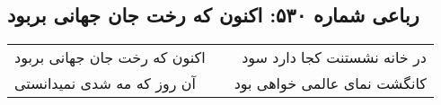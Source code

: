\begin{center}
\section*{رباعی شماره ۵۳۰: اکنون که رخت جان جهانی بربود}
\label{sec:0530}
\begin{longtable}{l p{0.5cm} r}
اکنون که رخت جان جهانی بربود
&&
در خانه نشستنت کجا دارد سود
\\
آن روز که مه شدی نمیدانستی
&&
کانگشت نمای عالمی خواهی بود
\\
\end{longtable}
\end{center}
